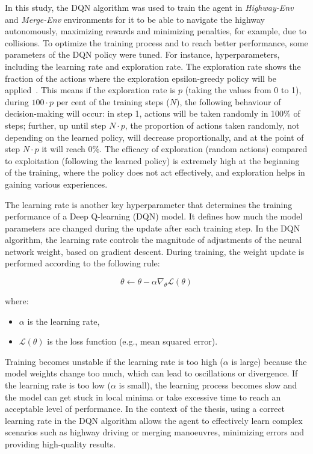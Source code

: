 In this study, the DQN algorithm was used to train the agent in \emph{Highway-Env}~\cite{highway-env} and \emph{Merge-Env} environments for it to be able to navigate the highway autonomously, maximizing rewards and minimizing penalties, for example, due to collisions. To optimize the training process and to reach better performance, some parameters of the DQN policy were tuned. For instance, hyperparameters, including the learning rate and exploration rate. The exploration rate shows the fraction of the actions where the exploration epsilon-greedy policy will be applied~\cite{tokic2011adaptive}. This means if the exploration rate is $p$ (taking the values from 0 to 1), during $100 \cdot p$ per cent of the training steps ($N$), the following behaviour of decision-making will occur: in step 1, actions will be taken randomly in 100\% of steps; further, up until step $N \cdot p$, the proportion of actions taken randomly, not depending on the learned policy, will decrease proportionally, and at the point of step $N \cdot p$ it will reach 0\%. The efficacy of exploration (random actions) compared to exploitation (following the learned policy) is extremely high at the beginning of the training, where the policy does not act effectively, and exploration helps in gaining various experiences.

The learning rate is another key hyperparameter that determines the training performance of a Deep Q-learning (DQN) model. It defines how much the model parameters are changed during the update after each training step. In the DQN algorithm, the learning rate controls the magnitude of adjustments of the neural network weight, based on gradient descent. During training, the weight update is performed according to the following rule:

\begin{equation}
    \theta \leftarrow \theta - \alpha \nabla_\theta \mathcal{L}(\theta)
    \label{eq:weights}
\end{equation}

where:
\begin{itemize}
    \item $\alpha$ is the learning rate,
    \item $\mathcal{L}(\theta)$ is the loss function (e.g., mean squared error).
\end{itemize}

Training becomes unstable if the learning rate is too high ($\alpha$ is large) because the model weights change too much, which can lead to oscillations or divergence. If the learning rate is too low ($\alpha$ is small), the learning process becomes slow and the model can get stuck in local minima or take excessive time to reach an acceptable level of performance. In the context of the thesis, using a correct learning rate in the DQN algorithm allows the agent to effectively learn complex scenarios such as highway driving or merging manoeuvres, minimizing errors and providing high-quality results.

